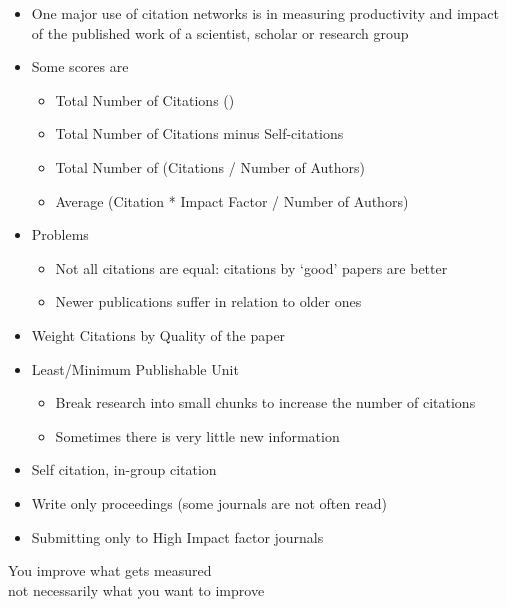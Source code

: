 \documentclass[a4paper,landscape,headrule,footrule,xetex]{foils}
\begin{document}
\begin{itemize}
\item One major use of citation networks is in measuring productivity
  and impact of the published work of a scientist, scholar or research
  group
\item Some scores are
  \begin{itemize}
  \item Total Number of Citations \hfill ()
  \item Total Number of Citations minus Self-citations
  \item Total Number of (Citations / Number of Authors)
  \item Average (Citation * Impact Factor / Number of Authors)
  \end{itemize}
\item Problems
  \begin{itemize}
  \item Not all citations are equal: citations by `good' papers are better
  \item Newer publications suffer in relation to older ones
  \end{itemize}
\item Weight Citations by Quality of the paper
\end{itemize}


\begin{itemize}
\item Least/Minimum Publishable Unit
  \begin{itemize}
  \item Break research into small chunks to  increase the number of citations
  \item Sometimes there is very little new information
  \end{itemize}
\item Self citation, in-group citation
\item Write only proceedings (some journals are not often read)
\item Submitting only to High Impact factor journals
\end{itemize}

\begin{center}
  You improve what gets measured \\
not necessarily what you want to improve
\end{center}

\end{document}
